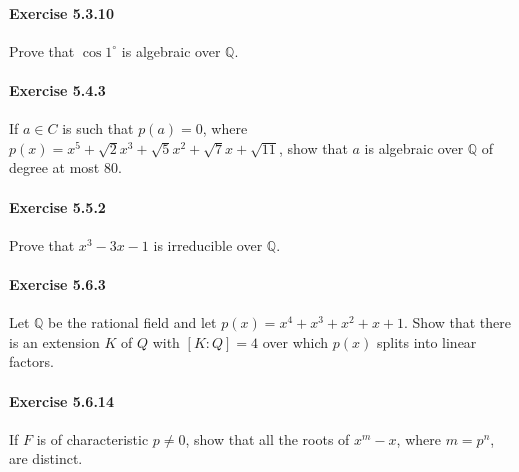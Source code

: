\documentclass{article}
\begin{document}
\paragraph{Exercise 5.3.10} Prove that $\cos 1^{\circ}$  is algebraic over $\mathbb{Q}$.

\paragraph{Exercise 5.4.3} If $a \in C$ is such that $p(a) = 0$, where $p(x) = x^5 + \sqrt{2}x^3 + \sqrt{5}x^2 + \sqrt{7}x + \sqrt{11}$, show that $a$ is algebraic over $\mathbb{Q}$ of degree at most 80.

\paragraph{Exercise 5.5.2} Prove that $x^3 - 3x - 1$ is irreducible over $\mathbb{Q}$.

\paragraph{Exercise 5.6.3} Let $\mathbb{Q}$ be the rational field and let $p(x) = x^4 + x^3 + x^2 + x + 1$.  Show that there is an extension $K$ of $Q$ with $[K:Q] = 4$ over which $p(x)$ splits into linear factors.

\paragraph{Exercise 5.6.14} If $F$ is of characteristic $p \neq 0$, show that all the roots of $x^m - x$, where $m = p^n$, are distinct.
\end{document}
